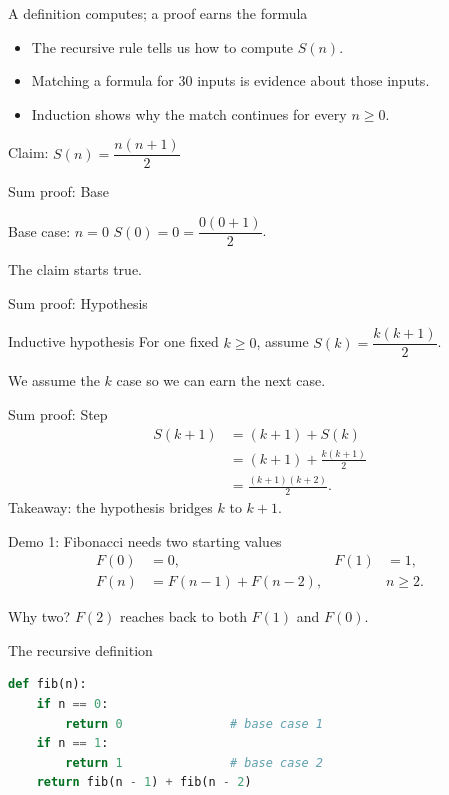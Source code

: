 \documentclass[aspectratio=169,10pt]{beamer}
\begin{document}
\begin{frame}{A definition computes; a proof earns the formula}
  \begin{itemize}
    \item The recursive rule tells us how to compute $S(n)$.
    \item Matching a formula for 30 inputs is evidence about those inputs.
    \item Induction shows why the match continues for every $n\ge 0$.
  \end{itemize}
  \vfill\centering\Large Claim: $S(n)=\dfrac{n(n+1)}2$
\end{frame}

\begin{frame}{Sum proof: Base}
  \begin{block}{Base case: $n=0$}
    $S(0)=0=\dfrac{0(0+1)}2$.
  \end{block}
  The claim starts true.
\end{frame}

\begin{frame}{Sum proof: Hypothesis}
  \begin{block}{Inductive hypothesis}
    For one fixed $k\ge 0$, assume $S(k)=\dfrac{k(k+1)}2$.
  \end{block}
  We assume the $k$ case so we can earn the next case.
\end{frame}

\begin{frame}{Sum proof: Step}
  \begin{align*}
    S(k+1)&=(k+1)+S(k)\\
          &=(k+1)+\frac{k(k+1)}2\\
          &=\frac{(k+1)(k+2)}2.
  \end{align*}
  \centering\Large Takeaway: the hypothesis bridges $k$ to $k+1$.
\end{frame}

\begin{frame}{Demo 1: Fibonacci needs two starting values}
  \begin{align*}
    F(0)&=0, & F(1)&=1,\\
    F(n)&=F(n-1)+F(n-2), && n\ge 2.
  \end{align*}
  \begin{block}{Why two?}
    $F(2)$ reaches back to both $F(1)$ and $F(0)$.
  \end{block}
\end{frame}

\begin{frame}[fragile]{The recursive definition}
\begin{lstlisting}[language=Python]
def fib(n):
    if n == 0:
        return 0               # base case 1
    if n == 1:
        return 1               # base case 2
    return fib(n - 1) + fib(n - 2)
\end{lstlisting}
\end{frame}
\end{document}
